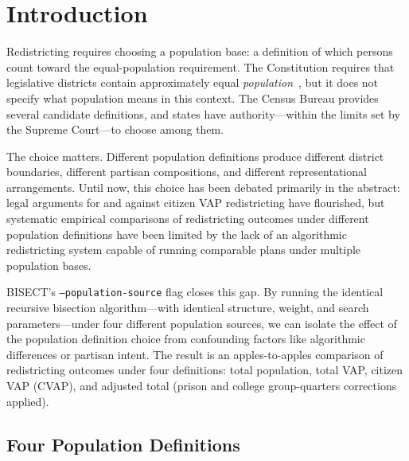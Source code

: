\section{Introduction}
\label{sec:introduction}

Redistricting requires choosing a population base: a definition of which persons count toward the equal-population requirement. The Constitution requires that legislative districts contain approximately equal \emph{population}~\citep{reynolds1964}, but it does not specify what population means in this context. The Census Bureau provides several candidate definitions, and states have authority---within the limits set by the Supreme Court---to choose among them.

The choice matters. Different population definitions produce different district boundaries, different partisan compositions, and different representational arrangements. Until now, this choice has been debated primarily in the abstract: legal arguments for and against citizen VAP redistricting have flourished, but systematic empirical comparisons of redistricting outcomes under different population definitions have been limited by the lack of an algorithmic redistricting system capable of running comparable plans under multiple population bases.

BISECT's \texttt{--population-source} flag closes this gap. By running the identical recursive bisection algorithm---with identical structure, weight, and search parameters---under four different population sources, we can isolate the effect of the population definition choice from confounding factors like algorithmic differences or partisan intent. The result is an apples-to-apples comparison of redistricting outcomes under four definitions: total population, total VAP, citizen VAP (CVAP), and adjusted total (prison and college group-quarters corrections applied).

\subsection{Four Population Definitions}

